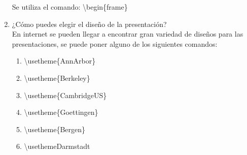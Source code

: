 \documentclass[letterpaper, 12pt, oneside]{article}%
\begin{document}
\begin{enumerate}
		Se utiliza el comando: \textbackslash begin\{frame\} 
		\item 
		¿Cómo puedes elegir el diseño de la presentación?\\
		En internet se pueden llegar a encontrar gran variedad de diseños para las presentaciones, se puede poner alguno de los siguientes comandos:
		\begin{enumerate}
			\item 
			\textbackslash usetheme\{AnnArbor\}
			\item
			\textbackslash usetheme\{Berkeley\}
			\item
			\textbackslash usetheme\{CambridgeUS\}
			\item
			\textbackslash usetheme\{Goettingen\}
			\item 
			\textbackslash usetheme\{Bergen\} 
			\item
			\textbackslash usetheme{Darmstadt}
			

\end{enumerate}
\end{enumerate}
\end{document}
